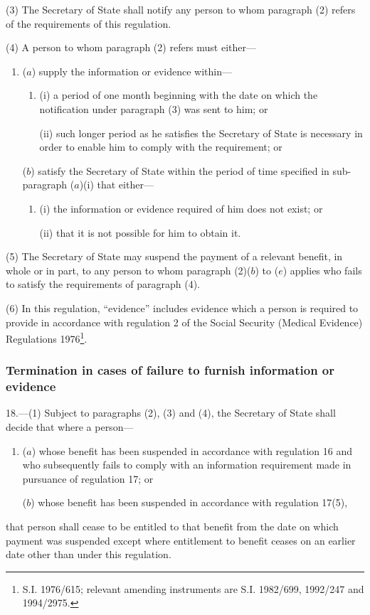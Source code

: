 \documentclass[12pt,a4paper]{article}
\begin{document}
(3) The Secretary of State shall notify any person to whom paragraph (2) refers of the requirements of this regulation.

(4) A person to whom paragraph (2) refers must either—
\begin{enumerate}\item[]
($a$) supply the information or evidence within—
\begin{enumerate}\item[]
(i) a period of one month beginning with the date on which the notification under paragraph (3) was sent to him; or

(ii) such longer period as he satisfies the Secretary of State is necessary in order to enable him to comply with the requirement; or
\end{enumerate}

($b$) satisfy the Secretary of State within the period of time specified in sub-paragraph ($a$)(i) that either—
\begin{enumerate}\item[]
(i) the information or evidence required of him does not exist; or

(ii) that it is not possible for him to obtain it.
\end{enumerate}
\end{enumerate}

(5) The Secretary of State may suspend the payment of a relevant benefit, in whole or in part, to any person to whom paragraph (2)($b$) to ($e$) applies who fails to satisfy the requirements of paragraph (4).

(6) In this regulation, “evidence” includes evidence which a person is required to provide in accordance with regulation 2 of the Social Security (Medical Evidence) Regulations 1976\footnote{\frenchspacing S.I. 1976/615; relevant amending instruments are S.I. 1982/699, 1992/247 and 1994/2975.}.


\subsubsection[18. Termination in cases of failure to furnish information or evidence]{Termination in cases of failure to furnish information or evidence}

18.—(1) Subject to paragraphs (2), (3) and (4), the Secretary of State shall decide that where a person—
\begin{enumerate}\item[]
($a$) whose benefit has been suspended in accordance with regulation 16 and who subsequently fails to comply with an information requirement made in pursuance of regulation 17; or

($b$) whose benefit has been suspended in accordance with regulation 17(5),
\end{enumerate}
that person shall cease to be entitled to that benefit from the date on which payment was suspended except where entitlement to benefit ceases on an earlier date other than under this regulation.
\end{document}
